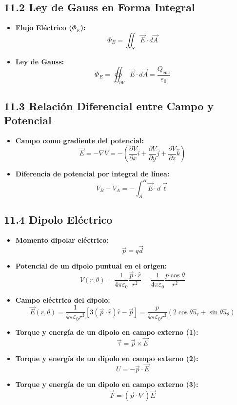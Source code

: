 \documentclass[11pt,a4paper]{article}
\begin{document}
\subsection*{11.2 Ley de Gauss en Forma Integral}

\begin{itemize}
  \item \textbf{Flujo Eléctrico ($\Phi_E$):}
  \[
    \Phi_E = \iint_S \vec{E} \cdot d\vec{A}
  \]
  \item \textbf{Ley de Gauss:}
  \[
    \Phi_E = \oiint_{\partial V} \vec{E} \cdot d\vec{A} = \frac{Q_{\mathrm{enc}}}{\varepsilon_0}
  \]
\end{itemize}

\subsection*{11.3 Relación Diferencial entre Campo y Potencial}

\begin{itemize}
  \item \textbf{Campo como gradiente del potencial:}
  \[
    \vec{E} = -\nabla V = -\left( \frac{\partial V}{\partial x}\hat{i} + \frac{\partial V}{\partial y}\hat{j} + \frac{\partial V}{\partial z}\hat{k} \right)
  \]
  \item \textbf{Diferencia de potencial por integral de línea:}
  \[
    V_B - V_A = -\int_A^B \vec{E} \cdot d\vec{\ell}
  \]
\end{itemize}

\subsection*{11.4 Dipolo Eléctrico}

\begin{itemize}
  \item \textbf{Momento dipolar eléctrico:}
  \[
    \vec{p} = q \vec{d}
  \]
  \item \textbf{Potencial de un dipolo puntual en el origen:}
  \[
    V(r, \theta) = \frac{1}{4\pi\varepsilon_0} \frac{\vec{p} \cdot \hat{r}}{r^2} = \frac{1}{4\pi\varepsilon_0} \frac{p \cos\theta}{r^2}
  \]
  \item \textbf{Campo eléctrico del dipolo:}
  \[
    \vec{E}(r, \theta) = \frac{1}{4\pi\varepsilon_0 r^3} \left[ 3(\vec{p} \cdot \hat{r})\hat{r} - \vec{p} \right] = \frac{p}{4\pi\varepsilon_0 r^3} (2\cos\theta \hat{u}_r + \sin\theta \hat{u}_\theta)
  \]
  \item \textbf{Torque y energía de un dipolo en campo externo (1):}
  \[
    \vec{\tau} = \vec{p} \times \vec{E}
  \]
  \item \textbf{Torque y energía de un dipolo en campo externo (2):}
  \[
    U = -\vec{p} \cdot \vec{E}
  \]
  \item \textbf{Torque y energía de un dipolo en campo externo (3):}
  \[
    \vec{F} = (\vec{p} \cdot \nabla)\vec{E}
  \]
\end{itemize}
\end{document}
